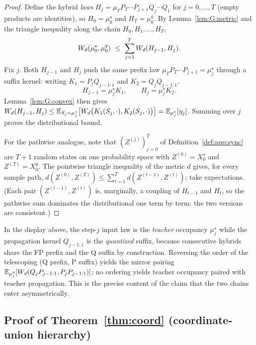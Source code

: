 \begin{proof}
Define the hybrid \emph{laws} $H_{j}=\mu_{T}P_{T}\cdots P_{j+1}Q_{j}\cdots Q_{1}$ for
$j=0,\dots,T$ (empty products are identities), so $H_{0}=\mu^{\star}_{0}$ and
$H_{T}=\mu^{q}_{0}$. By Lemma~\ref{lem:G:metric} and the triangle inequality along the chain
$H_{0},H_{1},\dots,H_{T}$,
\[
\Wd(\mu^{\star}_{0},\mu^{q}_{0})\ \le\ \sum_{j=1}^{T}\Wd(H_{j-1},H_{j}).
\]
Fix $j$. Both $H_{j-1}$ and $H_{j}$ push the same prefix law
$\mu_{T}P_{T}\cdots P_{j+1}=\mu^{\star}_{j}$ through a suffix kernel: writing
$K_{1}=P_{j}Q_{j-1:1}$ and $K_{2}=Q_{j}Q_{j-1:1}$,
\[
H_{j-1}=\mu^{\star}_{j}K_{1},\qquad H_{j}=\mu^{\star}_{j}K_{2}.
\]
Lemma~\ref{lem:G:convex} then gives
$W_{d}(H_{j-1},H_{j})\le\mathbb{E}_{S_{j}\sim\mu^{\star}_{j}}
\big[W_{d}\big(K_{1}(S_{j},\cdot),K_{2}(S_{j},\cdot)\big)\big]
=\mathbb{E}_{\mu^{\star}_{j}}[\eta_{j}]$. Summing over $j$ proves the distributional bound.

For the pathwise analogue, note that $(Z^{(j)})_{j=0}^{T}$ of Definition~\ref{def:app:sync} are
$T+1$ random states on one probability space with $Z^{(0)}=X^{\star}_{0}$ and
$Z^{(T)}=X^{q}_{0}$. The pointwise triangle inequality of the metric $d$ gives, for every sample
path,
$d(Z^{(0)},Z^{(T)})\le\sum_{t=1}^{T}d(Z^{(t-1)},Z^{(t)})$; take expectations. (Each pair
$(Z^{(t-1)},Z^{(t)})$ is, marginally, a coupling of $H_{t-1}$ and $H_{t}$, so the pathwise sum
dominates the distributional one term by term; the two versions are consistent.)
\end{proof}

\begin{remark}
\label{rem:G:asym}
In the display above, the step-$j$ input law is the \emph{teacher} occupancy $\mu^{\star}_{j}$
while the propagation kernel $Q_{j-1:1}$ is the \emph{quantized} suffix, because consecutive
hybrids share the FP prefix and the Q suffix by construction. Reversing the order of the
telescoping (Q prefix, P suffix) yields the mirror pairing
$\mathbb{E}_{\mu^{q}_{j}}[W_{d}(Q_{j}P_{j-1:1},P_{j}P_{j-1:1})]$; no ordering yields teacher occupancy
paired with teacher propagation. This is the precise content of the claim that the two chains
enter asymmetrically.
\end{remark}

\subsection{Proof of Theorem~\ref{thm:coord} (coordinate-union hierarchy)}
\label{app:proofs:coord}

